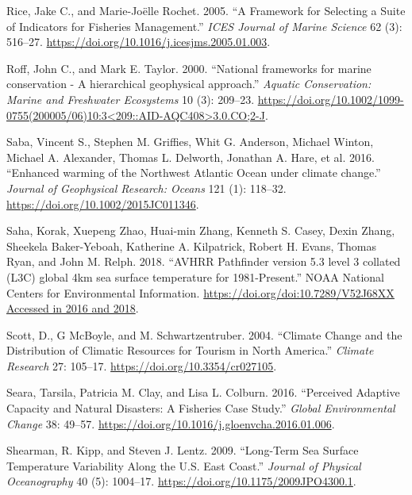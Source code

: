 \documentclass[
]{book}
\begin{document}
\leavevmode\hypertarget{ref-rice_framework_2005}{}%
Rice, Jake C., and Marie-Joëlle Rochet. 2005. ``A Framework for Selecting a Suite of Indicators for Fisheries Management.'' \emph{ICES Journal of Marine Science} 62 (3): 516--27. \url{https://doi.org/10.1016/j.icesjms.2005.01.003}.

\leavevmode\hypertarget{ref-Roff2000}{}%
Roff, John C., and Mark E. Taylor. 2000. ``National frameworks for marine conservation - A hierarchical geophysical approach.'' \emph{Aquatic Conservation: Marine and Freshwater Ecosystems} 10 (3): 209--23. \href{https://doi.org/10.1002/1099-0755(200005/06)10:3\%3C209::AID-AQC408\%3E3.0.CO;2-J}{https://doi.org/10.1002/1099-0755(200005/06)10:3\textless{}209::AID-AQC408\textgreater{}3.0.CO;2-J}.

\leavevmode\hypertarget{ref-Saba2016}{}%
Saba, Vincent S., Stephen M. Griffies, Whit G. Anderson, Michael Winton, Michael A. Alexander, Thomas L. Delworth, Jonathan A. Hare, et al. 2016. ``Enhanced warming of the Northwest Atlantic Ocean under climate change.'' \emph{Journal of Geophysical Research: Oceans} 121 (1): 118--32. \url{https://doi.org/10.1002/2015JC011346}.

\leavevmode\hypertarget{ref-Saha2018}{}%
Saha, Korak, Xuepeng Zhao, Huai-min Zhang, Kenneth S. Casey, Dexin Zhang, Sheekela Baker-Yeboah, Katherine A. Kilpatrick, Robert H. Evans, Thomas Ryan, and John M. Relph. 2018. ``AVHRR Pathfinder version 5.3 level 3 collated (L3C) global 4km sea surface temperature for 1981-Present.'' NOAA National Centers for Environmental Information. \href{https://doi.org/doi:10.7289/V52J68XX\%20Accessed\%20in\%202016\%20and\%202018}{https://doi.org/doi:10.7289/V52J68XX Accessed in 2016 and 2018}.

\leavevmode\hypertarget{ref-scott_climate_2004}{}%
Scott, D., G McBoyle, and M. Schwartzentruber. 2004. ``Climate Change and the Distribution of Climatic Resources for Tourism in North America.'' \emph{Climate Research} 27: 105--17. \url{https://doi.org/10.3354/cr027105}.

\leavevmode\hypertarget{ref-seara_perceived_2016}{}%
Seara, Tarsila, Patricia M. Clay, and Lisa L. Colburn. 2016. ``Perceived Adaptive Capacity and Natural Disasters: A Fisheries Case Study.'' \emph{Global Environmental Change} 38: 49--57. \url{https://doi.org/10.1016/j.gloenvcha.2016.01.006}.

\leavevmode\hypertarget{ref-shearman_long-term_2009}{}%
Shearman, R. Kipp, and Steven J. Lentz. 2009. ``Long-Term Sea Surface Temperature Variability Along the U.S. East Coast.'' \emph{Journal of Physical Oceanography} 40 (5): 1004--17. \url{https://doi.org/10.1175/2009JPO4300.1}.
\end{document}

